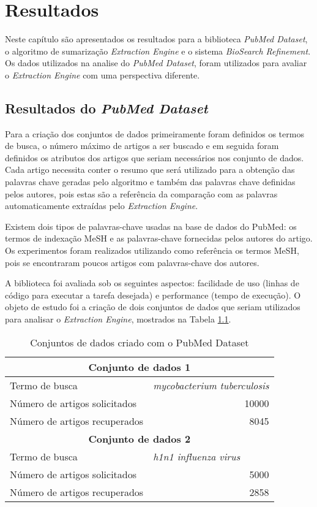 \chapter{Resultados}

Neste capítulo são apresentados os resultados para a biblioteca \emph{PubMed Dataset}, o algoritmo de sumarização \emph{Extraction Engine} e o sistema \emph{BioSearch Refinement}. Os dados utilizados na analise do \emph{PubMed Dataset}, foram utilizados para avaliar o \emph{Extraction Engine} com uma perspectiva diferente.

\section{Resultados do \emph{PubMed Dataset}}
Para a criação dos conjuntos de dados primeiramente foram definidos os termos de busca, o
número máximo de artigos a ser buscado e em seguida foram definidos os atributos dos artigos
que seriam necessários nos conjunto de dados. Cada artigo necessita conter o resumo que será
utilizado para a obtenção das palavras chave geradas pelo algoritmo e também das palavras
chave definidas pelos autores, pois estas são a referência da comparação com as palavras
automaticamente extraídas pelo \emph{Extraction Engine}.

Existem dois tipos de palavras-chave usadas na base de dados do PubMed: os termos de
indexação MeSH e as palavras-chave fornecidas pelos autores do artigo. Os experimentos foram
realizados utilizando como referência os termos MeSH, pois se encontraram poucos artigos com
palavras-chave dos autores.

A biblioteca foi avaliada sob os seguintes aspectos: facilidade de uso (linhas de código para executar a tarefa desejada) e performance (tempo de execução). O objeto de estudo foi a criação de dois conjuntos de dados que seriam utilizados para analisar o \emph{Extraction Engine}, mostrados na Tabela \ref{tab:datasets}.


\begin{table}[htbp]
\center
\begin{tabular}{|l|l|}
\hline
\multicolumn{ 2}{|c|}{\textbf{Conjunto de dados 1}} \\ \hline
Termo de busca & \textit{mycobacterium tuberculosis} \\ \hline
Número de artigos solicitados & \multicolumn{1}{r|}{10000} \\ \hline
Número de artigos recuperados & \multicolumn{1}{r|}{8045} \\ \hline
\multicolumn{ 2}{|c|}{\textbf{Conjunto de dados 2}} \\ \hline
Termo de busca & \textit{h1n1 influenza virus} \\ \hline
Número de artigos solicitados & \multicolumn{1}{r|}{5000} \\ \hline
Número de artigos recuperados & \multicolumn{1}{r|}{2858} \\ \hline
\end{tabular}
\caption{Conjuntos de dados criado com o PubMed Dataset}
\label{tab:datasets}
\end{table}

